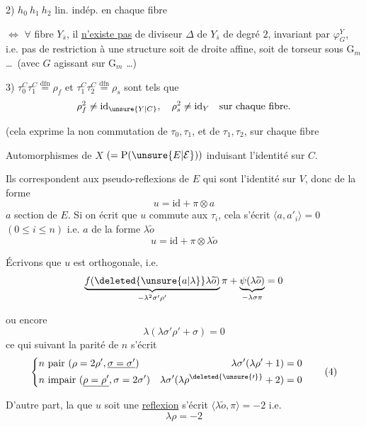 2) $h_0\ h_1\ h_2$ lin. indép. en chaque fibre


$\Longleftrightarrow$ \deleted{$\forall$} $\forall$ fibre  $Y_{\bar s}$, il \uline{n'existe pas} de diviseur $\Delta$ de $Y_{\bar s}$ de degré $2$, invariant par $\varphi_G^Y$, i.e. pas de restriction à une structure soit de droite affine, soit de  torseur sous $\mathrm G_m$ \ldots\ (avec $G$ agissant sur $\mathrm G_m$ \ldots)


3) $\tau_0^C\tau_1^C\overset{\mathrm{dfn}}=\rho_f$ et $\tau_1^C\tau_2^C\overset{\mathrm{dfn}}=\rho_s$ sont tels que
\[
\rho_f^2\ne\mathrm{id}_{\unsure{Y|C}},\quad \rho_s^2\ne\mathrm{id}_Y\quad\text{sur chaque fibre.}
\]

(cela exprime la non commutation de $\tau_0,\tau_1$, et de $\tau_1,\tau_2$, sur chaque fibre

 Automorphismes de $X$ $(=\mathrm P(\unsure{E|\mathcal E}))$ induisant l'identité sur $C$.

Ils correspondent aux pseudo-reflexions de $E$ qui sont l'identité sur $V$, donc de la forme
\[
u=\mathrm{id}+\pi\otimes a\tag*{(1)}
\]
$a$ section de $E$. Si on écrit que $u$ commute aux $\tau_i$, cela s'écrit $\langle a,a'_i\rangle=0$ $(0\leq i\leq n)$ i.e. $a$ de la forme $\lambda\widetilde o$
\[
u=\mathrm{id}+\pi\otimes\lambda\widetilde o\tag*{(2)}
\]

Écrivons que $u$ est orthogonale, i.e.
\[
\underbrace{f(\deleted{\unsure{a|\lambda}}\lambda\widetilde o)}_{-\lambda^2\sigma'\rho'}\pi+
\underbrace{\psi(\lambda\widetilde o)}_{-\lambda\sigma\pi}=0
\]

ou encore
\[
\lambda(\lambda\sigma'\rho'+\sigma)=0\tag*{(3)}
\]
ce qui suivant la parité de $n$ s'écrit
\[
\left\{\begin{aligned}
 &n\text{ pair }(\rho=2\rho',\underline{\sigma=\sigma'})&
 \lambda\sigma'(\lambda\rho'+1)&=0\\
 &n\text{ impair }(\underline{\rho=\rho'},\sigma=2\sigma')&
 \lambda\sigma'(\lambda\rho^{\deleted{\unsure{\prime}}}+2)&=0
\end{aligned}\right.\tag*{(4)}
\]

D'autre part, la   que $u$ soit une \uline{reflexion} s'écrit $\langle\lambda\widetilde o,\pi\rangle=-2$ i.e.
\[
\lambda\rho=-2\tag*{(5)}
\]


